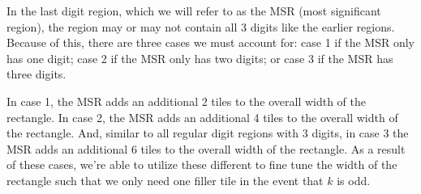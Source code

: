 In the last digit region, which we will refer to as the MSR (most significant region), the region may or may not contain all 3 digits like the earlier regions.
%
Because of this, there are three cases we must account for: case 1 if the MSR only has one digit; case 2 if the MSR only has two digits; or case 3 if the MSR has three digits.
%

%
In case 1, the MSR adds an additional 2 tiles to the overall width of the rectangle.
%
In case 2, the MSR adds an additional 4 tiles to the overall width of the rectangle.
%
And, similar to all regular digit regions with 3 digits, in case 3 the MSR adds an additional 6 tiles to the overall width of the rectangle.
%
As a result of these cases, we're able to utilize these different to fine tune the width of the rectangle such that we only need one filler tile in the event that $k$ is odd.
%


